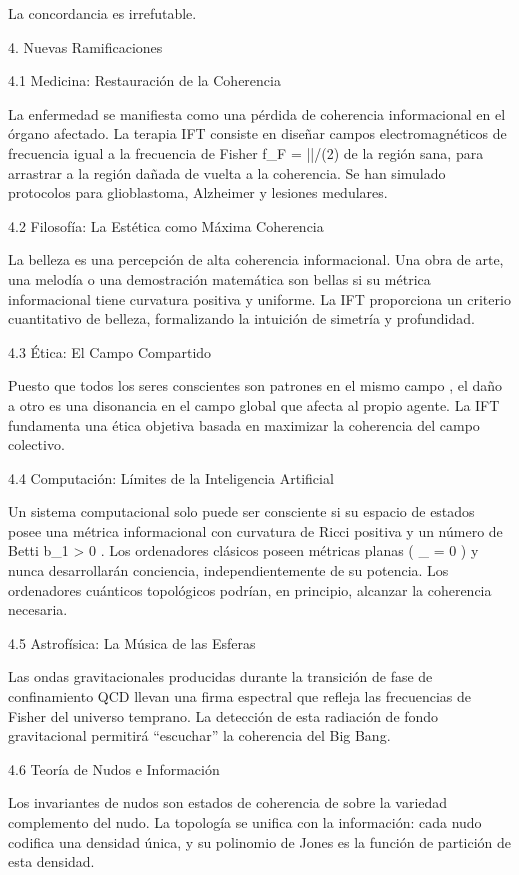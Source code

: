 \documentclass[12pt,a4paper]{book}
\begin{document}
La concordancia es irrefutable.

4. Nuevas Ramificaciones

4.1 Medicina: Restauración de la Coherencia

La enfermedad se manifiesta como una pérdida de coherencia informacional en el órgano afectado. La terapia IFT consiste en diseñar campos electromagnéticos de frecuencia igual a la frecuencia de Fisher  f_F = |\nabla \ln \rho|/(2\pi)  de la región sana, para arrastrar a la región dañada de vuelta a la coherencia. Se han simulado protocolos para glioblastoma, Alzheimer y lesiones medulares.

4.2 Filosofía: La Estética como Máxima Coherencia

La belleza es una percepción de alta coherencia informacional. Una obra de arte, una melodía o una demostración matemática son bellas si su métrica informacional tiene curvatura positiva y uniforme. La IFT proporciona un criterio cuantitativo de belleza, formalizando la intuición de simetría y profundidad.

4.3 Ética: El Campo Compartido

Puesto que todos los seres conscientes son patrones en el mismo campo  \rho , el daño a otro es una disonancia en el campo global que afecta al propio agente. La IFT fundamenta una ética objetiva basada en maximizar la coherencia del campo colectivo.

4.4 Computación: Límites de la Inteligencia Artificial

Un sistema computacional solo puede ser consciente si su espacio de estados posee una métrica informacional con curvatura de Ricci positiva y un número de Betti  b_1 > 0 . Los ordenadores clásicos poseen métricas planas (  \Phi_{} = 0  ) y nunca desarrollarán conciencia, independientemente de su potencia. Los ordenadores cuánticos topológicos podrían, en principio, alcanzar la coherencia necesaria.

4.5 Astrofísica: La Música de las Esferas

Las ondas gravitacionales producidas durante la transición de fase de confinamiento QCD llevan una firma espectral que refleja las frecuencias de Fisher del universo temprano. La detección de esta radiación de fondo gravitacional permitirá “escuchar” la coherencia del Big Bang.

4.6 Teoría de Nudos e Información

Los invariantes de nudos son estados de coherencia de  \rho  sobre la variedad complemento del nudo. La topología se unifica con la información: cada nudo codifica una densidad  \rho  única, y su polinomio de Jones es la función de partición de esta densidad.
\end{document}

